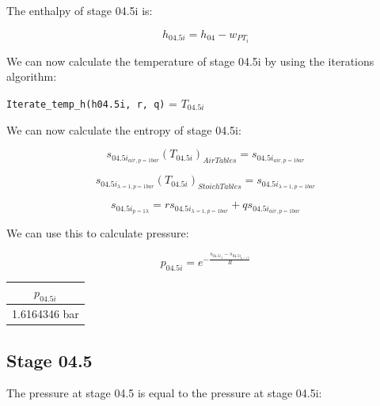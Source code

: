 \documentclass[titlepage]{article}
\begin{document}
    The enthalpy of stage 04.5i is:

    \begin{equation}
        h_{04.5i} = h_{04} - w_{PT_{i}}
    \end{equation}

    We can now calculate the temperature of stage 04.5i by using the iterations algorithm:

    \begin{center}
        \verb|Iterate_temp_h(h04.5i, r, q)| = $T_{04.5i}$
    \end{center}

    We can now calculate the entropy of stage 04.5i:

    \begin{equation}
        s_{04.5i_{air, p= 1 bar}}(T_{04.5i})_{Air Tables} = s_{04.5i_{air, p=1 bar}}
    \end{equation}

    \begin{equation}
        s_{04.5i_{\lambda=1, p= 1 bar}}(T_{04.5i})_{Stoich  Tables} = s_{04.5i_{\lambda=1, p = 1 bar}}
    \end{equation}

    \begin{equation}
        s_{04.5i_{p=1 \lambda}} = r s_{04.5i_{\lambda=1, p=1 bar}} + q s_{04.5i_{air, p=1 bar}}
    \end{equation}

    We can use this to calculate pressure:

    \begin{equation}
        p_{04.5i} = e^{ - \frac{s_{04.5i_{\lambda}} - s_{04.5i_{p=1 \lambda}}}{R}}
    \end{equation}

    \begin{center}
        \begin{tabular}{|c|}
            \hline
            $p_{04.5i}$ \\
            \hline
            1.6164346 bar \\
            \hline
        \end{tabular}
    \end{center}

    \subsection{Stage 04.5}

    The pressure at stage 04.5 is equal to the pressure at stage 04.5i:
\end{document}
